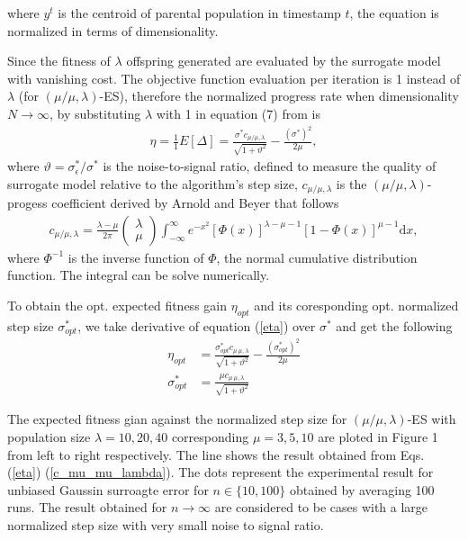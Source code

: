 where $y^{t}$ is the centroid of parental population in timestamp $t$, the equation is normalized in terms of dimensionality.

Since the fitness of $\lambda$ offspring generated are evaluated by the surrogate model with vanishing cost. The objective function evaluation per iteration is 1 instead of $\lambda$ (for $(\mu/\mu,\lambda)$-ES), therefore the normalized progress rate when dimensionality $N \rightarrow \infty$, by substituting $\lambda$ with 1 in equation (7) from \cite{ARNOLD2001127} is 
\begin{align}\label{eta}
\eta = \frac{1}{1}E[ \Delta] = \frac{\sigma^* c_{\mu / \mu, \lambda}}{\sqrt {1+ \vartheta^2}} - \frac{(\sigma^*)^2}{2 \mu},
\end{align}
where $\vartheta = \sigma_\epsilon^*/\sigma^*$ is the noise-to-signal ratio, defined to measure the quality of surrogate model relative to the algorithm's step size, $c_{\mu/\mu,\lambda}$ is the $(\mu/\mu,\lambda)$-progess coefficient derived by Arnold and Beyer \cite{Arnold:2000:EMS:645825.669117} that follows
\begin{align}\label{c_mu_mu_lambda}
c_{\mu/\mu,\lambda}  = \frac{\lambda-\mu}{2 \pi} \begin{pmatrix} \lambda \\ \mu \end{pmatrix} \int_{-\infty}^{\infty} e^{-x^2}   \left [ \Phi(x)\right]^{\lambda-\mu-1}  \left[ 1- \Phi (x) \right]^{\mu-1}  \text{d} x,
\end{align}
where $\Phi^{-1}$ is the inverse function of $\Phi$, the normal cumulative distribution function. The integral can be solve numerically.  

To obtain the opt. expected fitness gain $\eta_{opt}$ and its coresponding opt. normalized step size $\sigma^*_{opt}$, we take derivative of equation (\ref{eta}) over $\sigma^*$ and get the following 
\begin{align}\label{opt}
\eta_{opt} &= \frac{\sigma^*_{opt} c_{\mu \ \mu, \lambda}}{\sqrt {1+ \vartheta^2}} - \frac{(\sigma^*_{opt})^2}{2 \mu} \\
\sigma^*_{opt} &= \frac{ \mu c_{\mu \ \mu, \lambda}}{\sqrt {1+ \vartheta^2}}
\end{align}

The expected fitness gian against the normalized step size for $(\mu/\mu,\lambda)$-ES with population size $\lambda=10,20,40$ corresponding $\mu=3,5,10$ are ploted in Figure 1 from left to right respectively. The line shows the result obtained from Eqs. (\ref{eta}) (\ref{c_mu_mu_lambda}). The dots represent the experimental result for unbiased Gaussin surroagte error for $n \in \{10,100 \}$ obtained by averaging 100 runs. The result obtained for $n \rightarrow \infty$ are considered to be cases with a large normalized step size with very small noise to signal ratio. 

